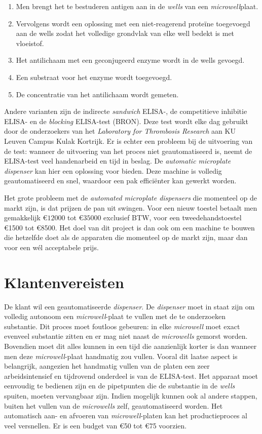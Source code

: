 \documentclass[a4paper,twoside,kulak]{kulakreport} %
\begin{document}
\begin{enumerate}
	\item Men brengt het te bestuderen antigen aan in de \textit{wells} van een \textit{microwell}plaat.
	\item Vervolgens wordt een oplossing met een niet-reagerend proteïne toegevoegd aan de wells zodat het volledige grondvlak van elke well bedekt is met vloeistof.
	\item Het antilichaam met een geconjugeerd enzyme wordt in de wells gevoegd.
	\item Een substraat voor het enzyme wordt toegevoegd. 
	\item De concentratie van het antilichaam wordt gemeten.
\end{enumerate}
Andere varianten zijn de indirecte \textit{sandwich} ELISA-, de competitieve inhibitie ELISA- en de \textit{blocking} ELISA-test (BRON).
Deze test wordt elke dag gebruikt door de onderzoekers van het \textit{Laboratory for Thrombosis Research} aan KU Leuven Campus Kulak Kortrijk. Er is echter een probleem bij de uitvoering van de test: wanneer de uitvoering van het proces niet geautomatiseerd is, neemt de ELISA-test veel handenarbeid en tijd in beslag. De \textit{automatic microplate dispenser} kan hier een oplossing voor bieden. Deze machine is volledig geautomatiseerd en snel, waardoor een pak efficiënter kan gewerkt worden. 

Het grote probleem met de \textit{automated microplate dispensers} die momenteel op de markt zijn, is dat prijzen de pan uit swingen. Voor een nieuw toestel betaalt men gemakkelijk \euro $12000$ tot \euro $35000$\cite{BioSPX} exclusief BTW, voor een tweedehandstoestel \euro 1500 tot \euro 8500\cite{LabX}. Het doel van dit project is dan ook om een machine te bouwen die hetzelfde doet als de apparaten die momenteel op de markt zijn, maar dan voor een wél acceptabele prijs.


\chapter{Klantenvereisten}
De klant wil een geautomatiseerde \textit{dispenser}. De \textit{dispenser} moet in staat zijn om volledig autonoom een \textit{microwell}-plaat te vullen met de te onderzoeken substantie. Dit proces moet foutloos gebeuren: in elke \textit{microwell} moet exact evenveel substantie zitten en er mag niet naast de \textit{microwells} gemorst worden. Bovendien moet dit alles kunnen in een tijd die aanzienlijk korter is dan wanneer men deze \textit{microwell}-plaat handmatig zou vullen. Vooral dit laatse aspect is belangrijk, aangezien het handmatig vullen van de platen een zeer arbeidsintensief en tijdrovend onderdeel is van de ELISA-test. Het apparaat moet eenvoudig te bedienen zijn en de pipetpunten die de substantie in de \textit{wells} spuiten, moeten vervangbaar zijn.  Indien mogelijk kunnen ook al andere stappen, buiten het vullen van de \textit{microwells} zelf, geautomatiseerd worden. Het automatisch aan- en afvoeren van \textit{microwell}-platen kan het productieproces al veel versnellen. Er is een budget van \euro 50 tot \euro 75 voorzien.
\end{document}
